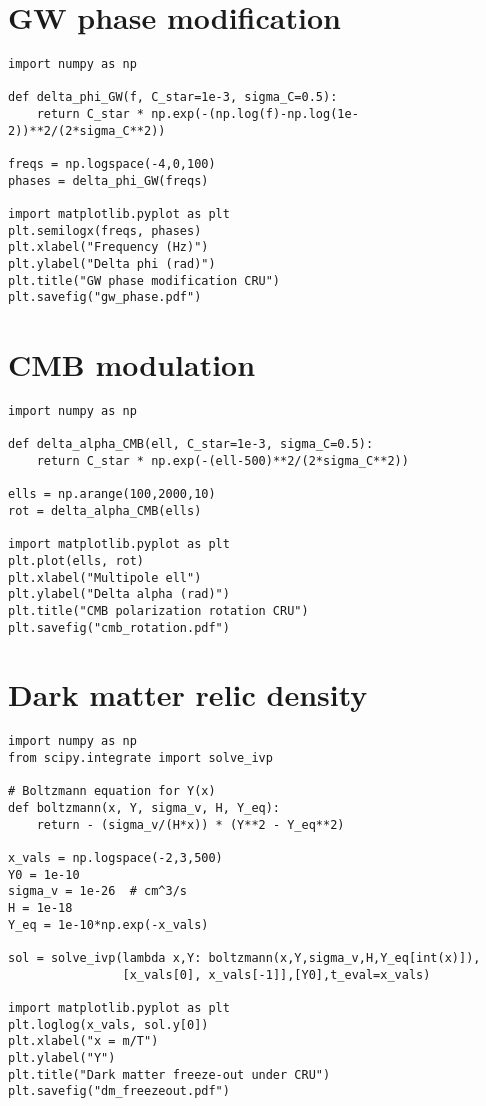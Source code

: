 \documentclass[%
 reprint,
 amsmath,amssymb,
 aps,
 pra,
 longbibliography,
 nofootinbib
]{revtex4-2}
\begin{document}
\section{GW phase modification}
\begin{verbatim}
import numpy as np

def delta_phi_GW(f, C_star=1e-3, sigma_C=0.5):
    return C_star * np.exp(-(np.log(f)-np.log(1e-2))**2/(2*sigma_C**2))

freqs = np.logspace(-4,0,100)
phases = delta_phi_GW(freqs)

import matplotlib.pyplot as plt
plt.semilogx(freqs, phases)
plt.xlabel("Frequency (Hz)")
plt.ylabel("Delta phi (rad)")
plt.title("GW phase modification CRU")
plt.savefig("gw_phase.pdf")
\end{verbatim}

\section{CMB modulation}
\begin{verbatim}
import numpy as np

def delta_alpha_CMB(ell, C_star=1e-3, sigma_C=0.5):
    return C_star * np.exp(-(ell-500)**2/(2*sigma_C**2))

ells = np.arange(100,2000,10)
rot = delta_alpha_CMB(ells)

import matplotlib.pyplot as plt
plt.plot(ells, rot)
plt.xlabel("Multipole ell")
plt.ylabel("Delta alpha (rad)")
plt.title("CMB polarization rotation CRU")
plt.savefig("cmb_rotation.pdf")
\end{verbatim}
\section{Dark matter relic density}
\begin{verbatim}
import numpy as np
from scipy.integrate import solve_ivp

# Boltzmann equation for Y(x)
def boltzmann(x, Y, sigma_v, H, Y_eq):
    return - (sigma_v/(H*x)) * (Y**2 - Y_eq**2)

x_vals = np.logspace(-2,3,500)
Y0 = 1e-10
sigma_v = 1e-26  # cm^3/s
H = 1e-18
Y_eq = 1e-10*np.exp(-x_vals)

sol = solve_ivp(lambda x,Y: boltzmann(x,Y,sigma_v,H,Y_eq[int(x)]),
                [x_vals[0], x_vals[-1]],[Y0],t_eval=x_vals)

import matplotlib.pyplot as plt
plt.loglog(x_vals, sol.y[0])
plt.xlabel("x = m/T")
plt.ylabel("Y")
plt.title("Dark matter freeze-out under CRU")
plt.savefig("dm_freezeout.pdf")
\end{verbatim}
\end{document}
